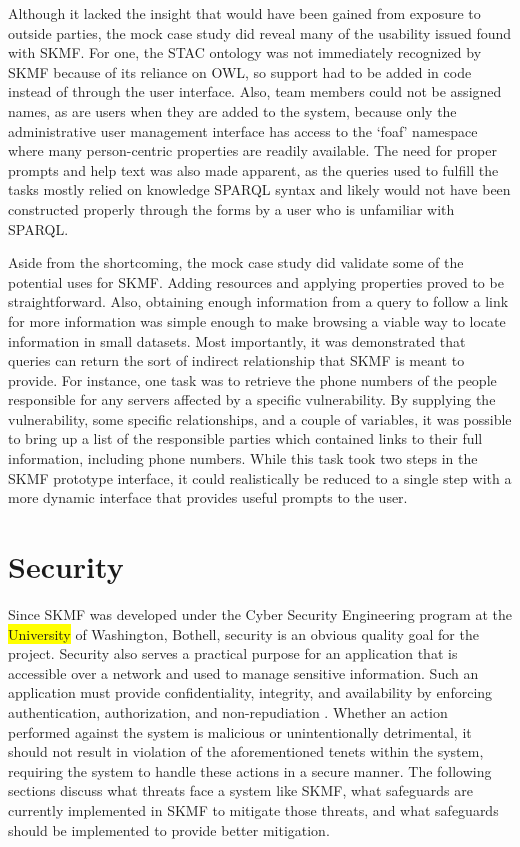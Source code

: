 Although it lacked the insight that would have been gained from exposure to outside parties, the mock case study did reveal many of the usability issued found with SKMF. For one, the STAC ontology was not immediately recognized by SKMF because of its reliance on OWL, so support had to be added in code instead of through the user interface. Also, team members could not be assigned names, as are users when they are added to the system, because only the administrative user management interface has access to the `foaf' namespace where many person-centric properties are readily available. The need for proper prompts and help text was also made apparent, as the queries used to fulfill the tasks mostly relied on knowledge SPARQL syntax and likely would not have been constructed properly through the forms by a user who is unfamiliar with SPARQL.

Aside from the shortcoming, the mock case study did validate some of the potential uses for SKMF. Adding resources and applying properties proved to be straightforward. Also, obtaining enough information from a query to follow a link for more information was simple enough to make browsing a viable way to locate information in small datasets. Most importantly, it was demonstrated that queries can return the sort of indirect relationship that SKMF is meant to provide. For instance, one task was to retrieve the phone numbers of the people responsible for any servers affected by a specific vulnerability. By supplying the vulnerability, some specific relationships, and a couple of variables, it was possible to bring up a list of the responsible parties which contained links to their full information, including phone numbers. While this task took two steps in the SKMF prototype interface, it could realistically be reduced to a single step with a more dynamic interface that provides useful prompts to the user.


\section{Security}
\label{result:security}

Since SKMF was developed under the Cyber Security Engineering program at the
\colorbox{yellow}{University}
of Washington, Bothell, security is an obvious quality goal for the project. Security also serves a practical purpose for an application that is accessible over a network and used to manage sensitive information. Such an application must provide confidentiality, integrity, and availability by enforcing authentication, authorization, and non-repudiation
\cite{incidentresponse}.
Whether an action performed against the system is malicious or unintentionally detrimental, it should not result in violation of the aforementioned tenets within the system, requiring the system to handle these actions in a secure manner. The following sections discuss what threats face a system like SKMF, what safeguards are currently implemented in SKMF to mitigate those threats, and what safeguards should be implemented to provide better mitigation.


